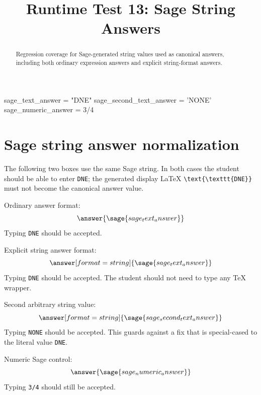 \documentclass{ximera}
\title{Runtime Test 13: Sage String Answers}
\begin{document}
\begin{abstract}
Regression coverage for Sage-generated string values used as canonical answers,
including both ordinary expression answers and explicit string-format answers.
\end{abstract}
\maketitle

\begin{sagesilent}
sage_text_answer = "DNE"
sage_second_text_answer = 'NONE'
sage_numeric_answer = 3/4
\end{sagesilent}

\section{Sage string answer normalization}

The following two boxes use the same Sage string.  In both cases the student
should be able to enter \texttt{DNE}; the generated display LaTeX
\verb|\text{\texttt{DNE}}| must not become the canonical answer value.

\begin{problem}
Ordinary answer format:
\[
\answer{\sage{sage_text_answer}}
\]
Typing \texttt{DNE} should be accepted.
\end{problem}

\begin{problem}
Explicit string answer format:
\[
\answer[format=string]{\sage{sage_text_answer}}
\]
Typing \texttt{DNE} should be accepted.  The student should not need to type
any TeX wrapper.
\end{problem}

\begin{problem}
Second arbitrary string value:
\[
\answer[format=string]{\sage{sage_second_text_answer}}
\]
Typing \texttt{NONE} should be accepted.  This guards against a fix that is
special-cased to the literal value \texttt{DNE}.
\end{problem}

\begin{problem}
Numeric Sage control:
\[
\answer{\sage{sage_numeric_answer}}
\]
Typing \texttt{3/4} should still be accepted.
\end{problem}
\end{document}
